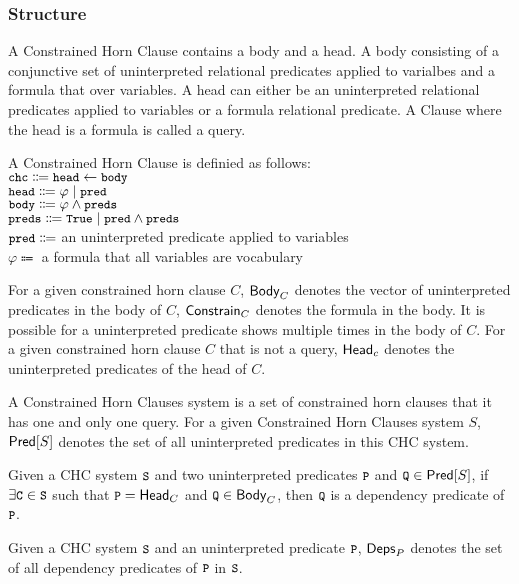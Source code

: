 \subsubsection{Structure}
A Constrained Horn Clause contains a body and a head.
%
A body consisting of a conjunctive set of uninterpreted relational predicates applied to varialbes and a formula
that over variables.
%
A head can either be an uninterpreted relational predicates applied to variables or a formula 
relational predicate.
%
A Clause where the head is a formula is called a query.
\begin{defn}
  A Constrained Horn Clause is definied as follows: \\
  $\cc{chc} \Coloneqq \cc{head} \gets \cc{body}$ \\
  $\cc{head} \Coloneqq \varphi \mid \cc{pred}$  \\
  $\cc{body} \Coloneqq \varphi \wedge \cc{preds}$ \\
  $\cc{preds} \Coloneqq \cc{True} \mid \cc{pred} \wedge \cc{preds}$ \\
  $\cc{pred} \Coloneqq$ an uninterpreted predicate applied to variables \\
  $\varphi \Coloneqq$ a formula that all variables are vocabulary \\
\end{defn}
%
For a given constrained horn clause $C$, $\mathsf{Body}_{C}$ denotes
the vector of uninterpreted predicates in the body of $C$, $\mathsf{Constrain}_{C}$
denotes the formula in the body.
%
It is possible for a uninterpreted predicate shows multiple times in the
body of $C$.
%
For a given constrained horn clause $C$ that is not a query,
$\mathsf{Head}_{c}$ denotes the uninterpreted predicates of the head of $C$.
%

A Constrained Horn Clauses system is a set of constrained horn clauses 
that it has one and only one query.
%
For a given Constrained Horn Clauses system $S$,$\mathsf{Pred}[ S ]$ denotes 
the set of all uninterpreted predicates in this CHC system.

\begin{defn}
  Given a CHC system $\cc{S}$ and two uninterpreted predicates $\cc{P}$ and
  $\cc{Q} \in \predof{S}$, if $\exists \cc{C} \in \cc{S}$ such that $\cc{P} = \headof{C}$
  and $\cc{Q} \in \bodyof{C}$, then $\cc{Q}$ is a dependency predicate of $\cc{P}$.
\end{defn}
%
Given a CHC system $\cc{S}$ and an uninterpreted predicate $\cc{P}$, $\mathsf{Deps}_{P}$
denotes the set of all dependency predicates of $\cc{P}$ in $\cc{S}$.
%

